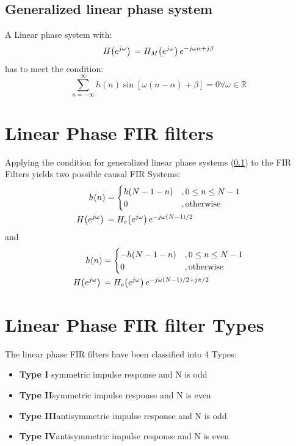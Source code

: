 \documentclass[accentcolor=tud4c,9.5pt,nochapname,bigchapter,paper=a5report]{tudreport}
\begin{document}
\subsection{Generalized linear phase system} \label{genLPS}
A Linear phase system with:
\begin{equation}
	H{\left(e^{j\omega}\right)}\, = H_M{\left(e^{j\omega}\right)}\, e^{-j\omega \alpha + j\beta}
\end{equation}
has to meet the condition:
\begin{equation} 
	\sum\limits_{n=-\infty}^{\infty} h(n)\sin[\omega (n-\alpha )+\beta] = 0 \forall \omega \in \mathbb{R}
\end{equation}

\section {Linear Phase FIR filters}
Applying the condition for generalized linear phase systems (\ref{genLPS}) to the FIR Filters yields two possible causal FIR Systems:
\begin{subequations}
\begin{align}
h(n) &= \begin{cases}
h(N-1-n)	&,0\leq n \leq N-1 \\
0			&,\text{otherwise} 
\end{cases} \\
H{\left(e^{j\omega}\right)}\, &= H_e{\left(e^{j\omega}\right)}\, e^{-j\omega (N-1)/2}
\end{align}
\end{subequations}
{\center and}
\begin{subequations}
\begin{align}
h(n) &= \begin{cases}
-h(N-1-n)	&,0\leq n \leq N-1 \\
0			&,\text{otherwise} 
\end{cases} \\
H{\left(e^{j\omega}\right)}\, &= H_o{\left(e^{j\omega}\right)}\, e^{-j\omega (N-1)/2+j\pi /2}
\end{align}
\end{subequations}

\section {Linear Phase FIR filter Types}
The linear phase FIR filters have been classified into 4 Types:

\begin{itemize}
  \item {\bf Type I} \quad symmetric impulse response and N is odd
  \item {\bf Type II}\quad symmetric impulse response and N is even
  \item {\bf Type III}\quad antisymmetric impulse response and N is odd
  \item {\bf Type IV}\quad antisymmetric impulse response and N is even
\end{itemize}
\end{document}
